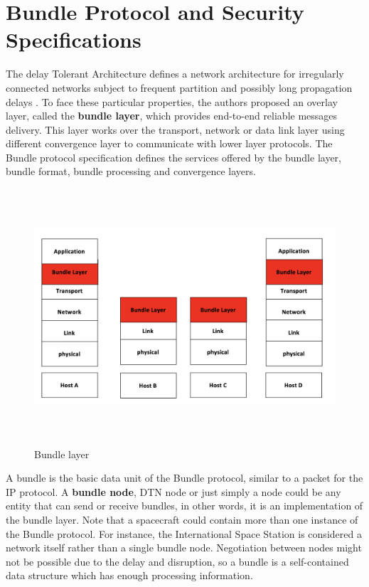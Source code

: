 \section{Bundle Protocol and Security Specifications}
\label{sec:dtn}

The delay Tolerant Architecture defines a network architecture for irregularly connected networks subject to frequent partition and possibly long propagation delays \cite{cerf2007delay}. To face these particular properties, the authors proposed an overlay layer, called the \textbf{bundle layer}, which provides end-to-end reliable messages delivery. This layer works over the transport, network or data link layer using different convergence layer to communicate with lower layer protocols. The Bundle protocol specification \cite{rfc5050} defines the services offered by the bundle layer, bundle format, bundle processing and convergence layers. 

\begin{figure}[ht]
\centering
\includegraphics[width=1 \linewidth, height=9.5cm]{images/bundle.png} 
\caption{Bundle layer}
\label{fig:bundle}
\end{figure}

A bundle is the basic data unit of the Bundle protocol, similar to a packet for the IP protocol. A \textbf{bundle node}, DTN node or just simply a node could be any entity that can send or receive bundles, in other words, it is an implementation of the bundle layer. Note that a spacecraft could contain more than one instance of the Bundle protocol. For instance, the International Space Station is considered a network itself rather than a single bundle node. Negotiation between nodes might not be possible due to the delay and disruption, so a bundle is a self-contained data structure which has enough processing information.


